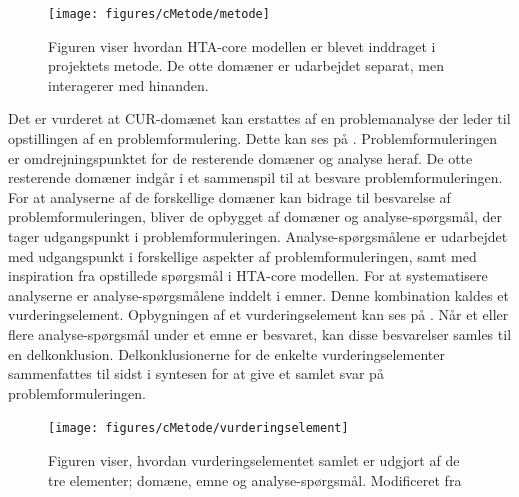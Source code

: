 \begin{figure}[H] 
	\begin{center}
		\texttt{[image: figures/cMetode/metode]}
	\end{center}
	\caption{Figuren viser hvordan HTA-core modellen er blevet inddraget i projektets metode. De otte domæner er udarbejdet separat, men interagerer med hinanden.} 
	\label{fig:metode} 
\end{figure}\vspace{-.25cm}

Det er vurderet at CUR-domænet kan erstattes af en problemanalyse der leder til opstillingen af en problemformulering. Dette kan ses på . Problemformuleringen er omdrejningspunktet for de resterende domæner og analyse heraf. De otte resterende domæner indgår i et sammenspil til at besvare problemformuleringen. For at analyserne af de forskellige domæner kan bidrage til besvarelse af problemformuleringen, bliver de opbygget af domæner og analyse-spørgsmål, der tager udgangspunkt i problemformuleringen. Analyse-spørgsmålene er udarbejdet med udgangspunkt i forskellige aspekter af problemformuleringen, samt med inspiration fra opstillede spørgsmål i HTA-core modellen. For at systematisere analyserne er analyse-spørgsmålene inddelt i emner. Denne kombination kaldes et vurderingselement. Opbygningen af et vurderingselement kan ses på . Når et eller flere analyse-spørgsmål under et emne er besvaret, kan disse besvarelser samles til en delkonklusion. Delkonklusionerne for de enkelte vurderingselementer sammenfattes til sidst i syntesen for at give et samlet svar på problemformuleringen. \citep{HTAcore}


\begin{figure}[H] 
\begin{center}
\texttt{[image: figures/cMetode/vurderingselement]}
\end{center}
\caption{Figuren viser, hvordan vurderingselementet samlet er udgjort af de tre elementer; domæne, emne og analyse-spørgsmål. Modificeret fra }
\label{fig:vurderingselement} 
\end{figure}

